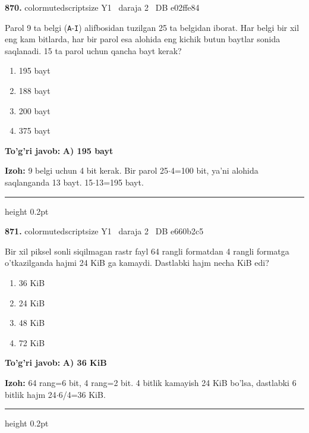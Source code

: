 \documentclass[10pt,a4paper,oneside]{article}
\begin{document}
\noindent\textbf{\color{ink}870.}  {color{muted}scriptsize Y1 \textbullet\ daraja 2 \textbullet\ DB e02ffe84}
\par
Parol 9 ta belgi (\texttt{A}-\texttt{I}) alifbosidan tuzilgan 25 ta belgidan iborat. Har belgi bir xil eng kam bitlarda, har bir parol esa alohida eng kichik butun baytlar sonida saqlanadi. 15 ta parol uchun qancha bayt kerak?
\begin{enumerate}[label=\Alph*),leftmargin=9mm]
\item 195 bayt
\item 188 bayt
\item 200 bayt
\item 375 bayt
\end{enumerate}
\begin{tcolorbox}[enhanced,breakable,colback=teal!4,colframe=teal!50!black,boxrule=0.5pt,arc=1.1mm,left=3mm,right=3mm,top=1.7mm,bottom=1.7mm,before skip=2mm,after skip=2mm]
\textbf{\color{teal}To'g'ri javob:} \textbf{A) 195 bayt}
\par\smallskip
\textbf{Izoh:} 9 belgi uchun 4 bit kerak. Bir parol 25\ensuremath{\cdot}4=100 bit, ya'ni alohida saqlanganda 13 bayt. 15\ensuremath{\cdot}13=195 bayt.
\end{tcolorbox}
\vspace{2mm}\hrule height 0.2pt \vspace{3mm}

\noindent\textbf{\color{ink}871.}  {color{muted}scriptsize Y1 \textbullet\ daraja 2 \textbullet\ DB e660b2c5}
\par
Bir xil piksel sonli siqilmagan rastr fayl 64 rangli formatdan 4 rangli formatga o'tkazilganda hajmi 24 KiB ga kamaydi. Dastlabki hajm necha KiB edi?
\begin{enumerate}[label=\Alph*),leftmargin=9mm]
\item 36 KiB
\item 24 KiB
\item 48 KiB
\item 72 KiB
\end{enumerate}
\begin{tcolorbox}[enhanced,breakable,colback=teal!4,colframe=teal!50!black,boxrule=0.5pt,arc=1.1mm,left=3mm,right=3mm,top=1.7mm,bottom=1.7mm,before skip=2mm,after skip=2mm]
\textbf{\color{teal}To'g'ri javob:} \textbf{A) 36 KiB}
\par\smallskip
\textbf{Izoh:} 64 rang=6 bit, 4 rang=2 bit. 4 bitlik kamayish 24 KiB bo'lsa, dastlabki 6 bitlik hajm 24\ensuremath{\cdot}6/4=36 KiB.
\end{tcolorbox}
\vspace{2mm}\hrule height 0.2pt \vspace{3mm}
\end{document}
